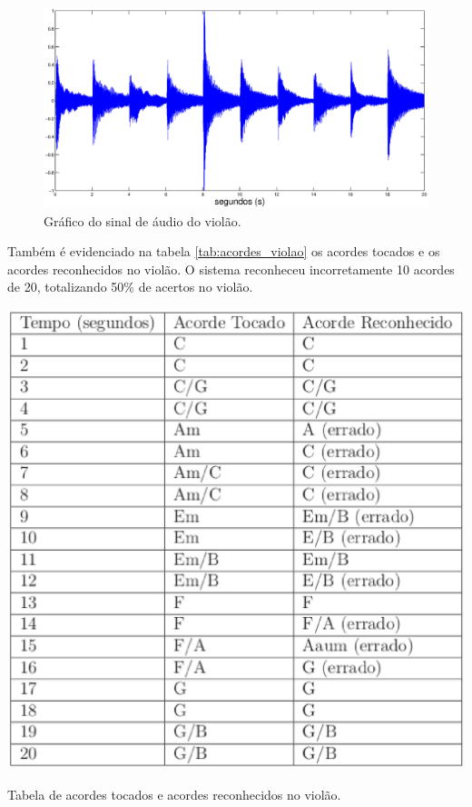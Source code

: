\begin{figure}[h]
    \centering
    \includegraphics[keepaspectratio=true,scale=0.3]{figuras/acordes_violao.eps}
  \caption{Gráfico do sinal de áudio do violão.}
  \label{fig:acordes_violao}
\end{figure}

Também é evidenciado na tabela \ref{tab:acordes_violao} os acordes tocados e os acordes reconhecidos no violão. O sistema reconheceu incorretamente 10 acordes de 20, totalizando 50\% de acertos no violão.

\begin{table}[h]
\centering
    \includegraphics[keepaspectratio=true,scale=0.5]{figuras/tabela_acordes_violao.eps}
  \caption{Tabela de acordes tocados e acordes reconhecidos no violão.}
  \label{tab:acordes_violao}
\end{table}


